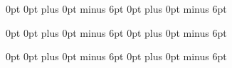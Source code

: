 \usepackage{titlesec}
\titlespacing*{\section}
{0pt} %
{0pt plus 0pt minus 6pt}
{0pt plus 0pt minus 6pt} 

\titlespacing*{\subsection}
{0pt} %
{0pt plus 0pt minus 6pt}
{0pt plus 0pt minus 6pt} 

\titlespacing*{\subsubsection}
{0pt} %
{0pt plus 0pt minus 6pt}
{0pt plus 0pt minus 6pt} 

\usepackage{float} %

